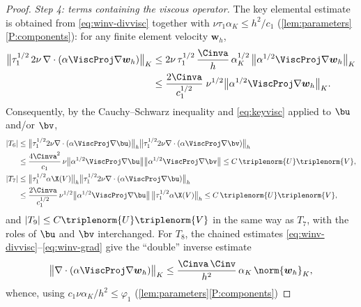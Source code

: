 \begin{proof}
\medskip\noindent\emph{Step 4: terms containing the viscous operator.}
The key elemental estimate is obtained from \eqref{eq:winv-divvisc} together with
$\nu\tau_1\alpha_K\le h^2/c_1$ (\cref{lem:parameters}\ref{P:components}): for any finite
element velocity $\boldsymbol{w}_h$,
\begin{equation}\label{eq:keyvisc}
\begin{aligned}
  \bigl\lVert\tau_1^{1/2}\,2\nu\,
  \nabla\cdot(\alpha\ViscProj\nabla\boldsymbol{w}_h)\bigr\rVert_{K}
  &\le 2\nu\,\tau_1^{1/2}\,\frac{\Cinva}{h}\,\alpha_K^{1/2}\,
  \bigl\lVert\alpha^{1/2}\ViscProj\nabla\boldsymbol{w}_h\bigr\rVert_{K} \\
  &\le \frac{2\Cinva}{c_1^{1/2}}\;\nu^{1/2}
  \bigl\lVert\alpha^{1/2}\ViscProj\nabla\boldsymbol{w}_h\bigr\rVert_{K}.
\end{aligned}
\end{equation}
Consequently, by the Cauchy--Schwarz inequality and \eqref{eq:keyvisc} applied to $\bu$
and/or $\bv$,
\begin{align}
  |T_6| &\le
  \bigl\lVert\tau_1^{1/2}2\nu\nabla\cdot(\alpha\ViscProj\nabla\bu)\bigr\rVert_h
  \bigl\lVert\tau_1^{1/2}2\nu\nabla\cdot(\alpha\ViscProj\nabla\bv)\bigr\rVert_h \nonumber\\
  &\le \frac{4\Cinva^2}{c_1}\,
  \nu\bigl\lVert\alpha^{1/2}\ViscProj\nabla\bu\bigr\rVert
  \bigl\lVert\alpha^{1/2}\ViscProj\nabla\bv\bigr\rVert
  \le C\,\triplenorm{U}\triplenorm{V}, \label{eq:T6bound}\\
  |T_7| &\le
  \bigl\lVert\tau_1^{1/2}\alpha\X(V)\bigr\rVert_h
  \bigl\lVert\tau_1^{1/2}2\nu\nabla\cdot(\alpha\ViscProj\nabla\bu)\bigr\rVert_h \nonumber\\
  &\le \frac{2\Cinva}{c_1^{1/2}}\,
  \nu^{1/2}\bigl\lVert\alpha^{1/2}\ViscProj\nabla\bu\bigr\rVert\,
  \bigl\lVert\tau_1^{1/2}\alpha\X(V)\bigr\rVert_h
  \le C\,\triplenorm{U}\triplenorm{V}, \label{eq:T7bound}
\end{align}
and $|T_9|\le C\triplenorm{U}\triplenorm{V}$ in the same way as $T_7$, with the roles of
$\bu$ and $\bv$ interchanged. For $T_8$, the chained estimates
\eqref{eq:winv-divvisc}--\eqref{eq:winv-grad} give the ``double'' inverse estimate
\begin{equation}\label{eq:doubleinv}
  \bigl\lVert\nabla\cdot(\alpha\ViscProj\nabla\boldsymbol{w}_h)\bigr\rVert_{K}
  \le \frac{\Cinva\,\Cinv}{h^2}\,\alpha_K\,\norm{\boldsymbol{w}_h}_{K},
\end{equation}
whence, using $c_1\nu\alpha_K/h^2\le\varphi_1$ (\cref{lem:parameters}\ref{P:components})

\end{proof}
